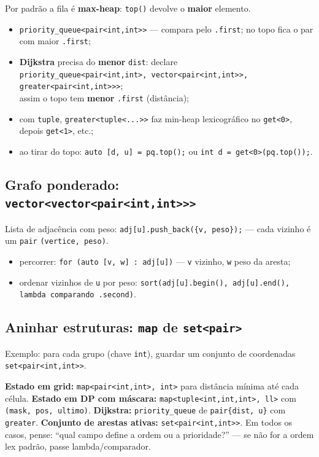 Por padrão a fila é \textbf{max-heap}: \texttt{top()} devolve o \textbf{maior} elemento.

\begin{itemize}[nosep]
  \item \texttt{priority\_queue<pair<int,int>>} --- compara pelo \texttt{.first}; no topo fica o par com maior \texttt{.first};
  \item \textbf{Dijkstra} precisa do \textbf{menor} \texttt{dist}: declare\\
        \texttt{priority\_queue<pair<int,int>, vector<pair<int,int>>, greater<pair<int,int>>>};\\
        assim o topo tem \textbf{menor} \texttt{.first} (distância);
  \item com \texttt{tuple}, \texttt{greater<tuple<...>>} faz min-heap lexicográfico no \texttt{get<0>}, depois \texttt{get<1>}, etc.;
  \item ao tirar do topo: \texttt{auto [d, u] = pq.top();} ou \texttt{int d = get<0>(pq.top());}.
\end{itemize}

\subsection{Grafo ponderado: \texttt{vector<vector<pair<int,int>>>}}

Lista de adjacência com peso: \texttt{adj[u].push\_back(\{v, peso\});} --- cada vizinho é um \texttt{pair} \texttt{(vertice, peso)}.

\begin{itemize}[nosep]
  \item percorrer: \texttt{for (auto [v, w] : adj[u])} --- \texttt{v} vizinho, \texttt{w} peso da aresta;
  \item ordenar vizinhos de \texttt{u} por peso: \texttt{sort(adj[u].begin(), adj[u].end(), lambda comparando .second)}.
\end{itemize}

\subsection{Aninhar estruturas: \texttt{map} de \texttt{set<pair>}}

Exemplo: para cada grupo (chave \texttt{int}), guardar um conjunto de coordenadas \texttt{set<pair<int,int>>}.

\begin{exemplodiabox}
\textbf{Estado em grid:} \texttt{map<pair<int,int>, int>} para distância mínima até cada célula. \textbf{Estado em DP com máscara:} \texttt{map<tuple<int,int,int>, ll>} com \texttt{(mask, pos, ultimo)}. \textbf{Dijkstra:} \texttt{priority\_queue} de \texttt{pair\{dist, u\}} com \texttt{greater}. \textbf{Conjunto de arestas ativas:} \texttt{set<pair<int,int>>}. Em todos os casos, pense: ``qual campo define a ordem ou a prioridade?'' --- se não for a ordem lex padrão, passe lambda/comparador.
\end{exemplodiabox}

